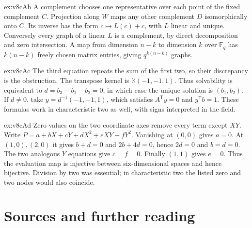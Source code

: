 \begin{solution}{ex:v8cAb}
\idea A complement chooses one representative over each point of the fixed complement $C$.
\writeup Projection along $W$ maps any other complement $D$ isomorphically onto $C$. Its inverse has the form $c\mapsto L(c)+c$, with $L$ linear and unique. Conversely every graph of a linear $L$ is a complement, by direct decomposition and zero intersection. A map from dimension $n-k$ to dimension $k$ over $\mathbb F_q$ has $k(n-k)$ freely chosen matrix entries, giving $q^{k(n-k)}$ graphs.
\end{solution}
\begin{solution}{ex:v8cAc}
\idea The third equation repeats the sum of the first two, so their discrepancy is the obstruction.
\writeup The transpose kernel is $\mathbb K(-1,-1,1)$. Thus solvability is equivalent to $d=b_3-b_1-b_2=0$, in which case the unique solution is $(b_1,b_2)$. If $d\ne0$, take $y=d^{-1}(-1,-1,1)$, which satisfies $A^{\mathsf T}y=0$ and $y^{\mathsf T}b=1$. These formulas work in characteristic two as well, with signs interpreted in the field.
\end{solution}
\begin{solution}{ex:v8cAd}
\idea Zero values on the two coordinate axes remove every term except $XY$.
\writeup Write $P=a+bX+cY+dX^2+eXY+fY^2$. Vanishing at $(0,0)$ gives $a=0$. At $(1,0),(2,0)$ it gives $b+d=0$ and $2b+4d=0$, hence $2d=0$ and $b=d=0$. The two analogous $Y$ equations give $c=f=0$. Finally $(1,1)$ gives $e=0$. Thus the evaluation map is injective between six-dimensional spaces and hence bijective. Division by two was essential; in characteristic two the listed zero and two nodes would also coincide.
\end{solution}

\section*{Sources and further reading}

